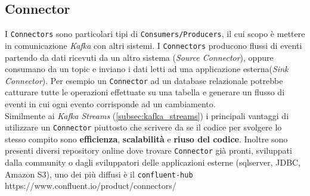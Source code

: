 \subsection{Connector}
\label{subsec:kafka_connectors}
I \texttt{Connectors} sono particolari tipi di \texttt{Consumers/Producers}, il cui scopo è mettere in comunicazione \textit{Kafka} con altri sistemi.
I \texttt{Connectors} producono flussi di eventi partendo da dati ricevuti da un altro sistema (\textit{Source Connector}), oppure consumano da un topic e inviano i dati letti ad una applicazione esterna(\textit{Sink Connector}).
Per esempio un \texttt{Connector} ad un database relazionale potrebbe catturare tutte le operazioni effettuate su una tabella e generare un flusso di eventi in cui ogni evento corrisponde ad un cambiamento.\\
Similmente ai \textit{Kafka Streams} (\ref{subsec:kafka_streams}) i principali vantaggi di utilizzare un \texttt{Connector} piuttosto che scrivere da se il codice per svolgere lo stesso compito sono
\textbf{efficienza}, \textbf{scalabilità} e \textbf{riuso del codice}.
Inoltre sono presenti diversi repository online dove trovare \texttt{Connector} già pronti, sviluppati dalla community o dagli sviluppatori delle applicazioni esterne (sqlserver, JDBC, Amazon S3),
uno dei più diffusi è il \texttt{confluent-hub} https://www.confluent.io/product/connectors/ 

\newpage
